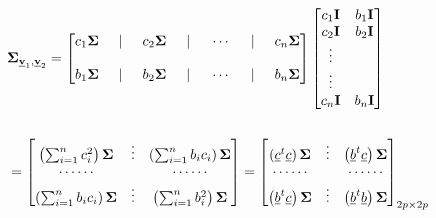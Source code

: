 \documentclass[
]{book}
\theoremstyle{definition}
\theoremstyle{definition}
\theoremstyle{definition}
\theoremstyle{definition}
\theoremstyle{remark}
\begin{document}
\begin{align*}
& \mathbf{\Sigma}_{\underline{\mathbf{v}}_1,\underline{\mathbf{v}}_2}=\begin{bmatrix}
 c_1\mathbf{\Sigma} \hspace{0.5cm}| \hspace{0.5cm} c_2\mathbf{\Sigma}  \hspace{0.5cm}| \hspace{0.5cm} \cdots  \hspace{0.5cm}| \hspace{0.5cm} c_n\mathbf{\Sigma} \\ \\ 
  b_1\mathbf{\Sigma} \hspace{0.5cm}| \hspace{0.5cm} b_2\mathbf{\Sigma}  \hspace{0.5cm}| \hspace{0.5cm} \cdots  \hspace{0.5cm}| \hspace{0.5cm} b_n\mathbf{\Sigma}
\end{bmatrix}\begin{bmatrix}
c_1\mathbf{I} & b_1\mathbf{I} \\ c_2\mathbf{I} &b_2 \mathbf{I} \\ \vdots \\ \vdots \\ c_n\mathbf{I} & b_n \mathbf{I}
\end{bmatrix}  \\ \\
& =\begin{bmatrix}
\left( \sum_{i=1}^n c_i^2\right) \mathbf{\Sigma} & \vdots &  \left( \sum_{i=1}^n b_ic_i\right) \mathbf{\Sigma} \\
\cdots\cdots & & \cdots\cdots \\
\left( \sum_{i=1}^n b_ic_i\right) \mathbf{\Sigma} & \vdots & \left( \sum_{i=1}^n b_i^2\right) \mathbf{\Sigma}
\end{bmatrix}=\begin{bmatrix}
\left( \underline{c}^t\underline{c} \right) \mathbf{\Sigma} & \vdots &  \left( \underline{b}^t\underline{c} \right) \mathbf{\Sigma} \\
\cdots\cdots & & \cdots\cdots \\
\left( \underline{b}^t\underline{c} \right) \mathbf{\Sigma} & \vdots & \left( \underline{b}^t\underline{b}\right)\mathbf{\Sigma}
\end{bmatrix}_{2p \times 2p}
\end{align*}
\end{document}
